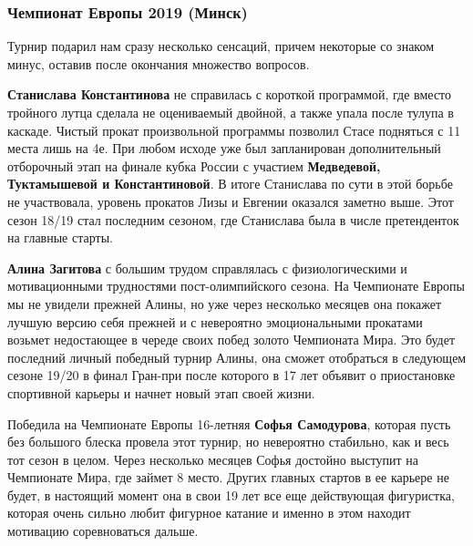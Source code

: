  
 
 
 
 
\subsubsection{Чемпионат Европы 2019 (Минск)}

Турнир подарил нам сразу несколько сенсаций, причем некоторые со знаком минус,
оставив после окончания множество вопросов.


\textbf{Станислава Константинова} не справилась с короткой программой, где вместо
тройного лутца сделала не оцениваемый двойной, а также упала после тулупа в
каскаде. Чистый прокат произвольной программы позволил Стасе подняться с 11
места лишь на 4е. При любом исходе уже был запланирован дополнительный
отборочный этап на финале кубка России с участием \textbf{Медведевой, Туктамышевой и
Константиновой}. В итоге Станислава по сути в этой борьбе не участвовала,
уровень прокатов Лизы и Евгении оказался заметно выше. Этот сезон 18/19 стал
последним сезоном, где Станислава была в числе претенденток на главные старты.


\textbf{Алина Загитова} с большим трудом справлялась с физиологическими и мотивационными
трудностями пост-олимпийского сезона. На Чемпионате Европы мы не увидели
прежней Алины, но уже через несколько месяцев она покажет лучшую версию себя
прежней и с невероятно эмоциональными прокатами возьмет недостающее в череде
своих побед золото Чемпионата Мира. Это будет последний личный победный турнир
Алины, она сможет отобраться в следующем сезоне 19/20 в финал Гран-при после
которого в 17 лет объявит о приостановке спортивной карьеры и начнет новый этап
своей жизни.

Победила на Чемпионате Европы 16-летняя \textbf{Софья Самодурова}, которая пусть без
большого блеска провела этот турнир, но невероятно стабильно, как и весь тот
сезон в целом. Через несколько месяцев Софья достойно выступит на Чемпионате
Мира, где займет 8 место. Других главных стартов в ее карьере не будет, в
настоящий момент она в свои 19 лет все еще действующая фигуристка, которая
очень сильно любит фигурное катание и именно в этом находит мотивацию
соревноваться дальше. 
